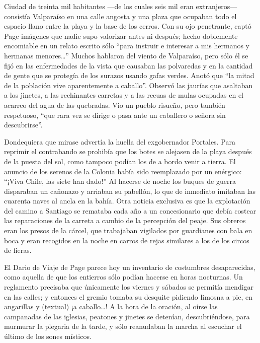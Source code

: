 \documentclass[10pt,twoside,openright]{memoir}
\begin{document}
Ciudad de treinta mil habitantes ---de los cuales seis mil eran
extranjeros--- consistía Valparaíso en una calle angosta y una plaza que
ocupaban todo el espacio llano entre la playa y la base de los cerros.
Con su ojo penetrante, captó Page imágenes que nadie supo valorizar
antes ni después; hecho doblemente encomiable en un relato escrito sólo
``para instruir e interesar a mis hermanos y hermanas menores\ldots'' Muchos
hablaron del viento de Valparaíso, pero sólo él se fijó en las
enfermedades de la vista que causaban las polvaredas y en la cantidad de
gente que se protegía de los surazos usando gafas verdes. Anotó que ``la
mitad de la población vive aparentemente a caballo''. Observó las jaurías
que asaltaban a los jinetes, a las rechinantes carretas y a las recuas
de mulas ocupadas en el acarreo del agua de las quebradas. Vio un pueblo
risueño, pero también respetuoso, ``que rara vez se dirige o pasa ante un
caballero o señora sin descubrirse''.

Dondequiera que mirase advertía la huella del exgobernador Portales.
Para reprimir el contrabando se prohibía que los botes se alejasen de la
playa después de la puesta del sol, como tampoco podían los de a bordo
venir a tierra. El anuncio de los serenos de la Colonia había sido
reemplazado por un enérgico: ``¡Viva Chile, las siete han dado!'' Al
hacerse de noche los buques de guerra disparaban un cañonazo y arriaban
su pabellón, lo que de inmediato imitaban las cuarenta naves al ancla en
la bahía. Otra noticia exclusiva es que la explotación del camino a
Santiago se remataba cada año a un concesionario que debía costear las
reparaciones de la carreta a cambio de la percepción del peaje. Sus
obreros eran los presos de la cárcel, que trabajaban vigilados por
guardianes con bala en boca y eran recogidos en la noche en carros de
rejas similares a los de los circos de fieras.

El Dario de Viaje de Page parece hoy un inventario de costumbres
desaparecidas, como aquella de que los entierros sólo podían hacerse en
horas nocturnas. Un reglamento precisaba que únicamente los viernes y
sábados se permitía mendigar en las calles; y entonces el gremio tomaba
su desquite pidiendo limosna a pie, en angarillas y (textual) ¡a
caballo\ldots! A la hora de la oración, al oírse las campanadas de las
iglesias, peatones y jinetes se detenían, descubriéndose, para murmurar
la plegaria de la tarde, y sólo reanudaban la marcha al escuchar el
último de los sones místicos.
\end{document}
